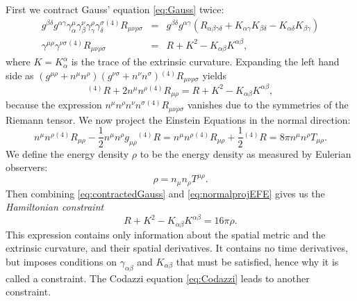 First we contract Gauss' equation \ref{eq:Gauss} twice:
\begin{equation}
\begin{array}{rcl}
g^{\beta \delta}g^{\alpha \gamma}\gamma_\alpha^\mu \gamma_\beta^\nu \gamma_\gamma^\rho \gamma_\delta^\sigma {}^{(4)}R_{\mu \nu \rho \sigma} & = & g^{\beta \delta}g^{\alpha \gamma}(R_{\alpha \beta \gamma \delta} + K_{\alpha \gamma}K_{\beta \delta} - K_{\alpha \delta}K_{\beta \gamma}) \\
\gamma^{\mu \rho} \gamma^{\nu \sigma}{}^{(4)}R_{\mu \nu \rho \sigma} & = &  R+K^2-K_{\alpha \beta}K^{\alpha \beta},
\end{array}
\end{equation}
where $K=K^\alpha_\alpha$ is the trace of the extrinsic curvature. Expanding the left hand side as $(g^{\mu \rho}+n^\mu n^\rho)(g^{\nu \sigma}+n^\nu n^\sigma){}^{(4)}R_{\mu \nu \rho \sigma}$ yields 
\begin{equation}
\label{eq:contractedGauss}
{}^{(4)}R+2 n^\mu n^\rho {}^{(4)}R_{\mu \rho} = R + K^2-K_{\alpha \beta}K^{\alpha \beta},
\end{equation}
because the expression $n^\mu n^\rho n^\nu n^\sigma {}^{(4)}R_{\mu \nu \rho \sigma}$ vanishes due to the symmetries of the Riemann tensor. We now project the Einstein Equations in the normal direction:
\begin{equation}
\label{eq:normalprojEFE}
n^\mu n^\rho {}^{(4)}R_{\mu \rho} - \frac{1}{2}n^\mu n^\rho g_{\mu \rho} {}^{(4)}R =n^\mu n^\rho {}^{(4)}R_{\mu \rho}+\frac{1}{2}{}^{(4)}R = 8 \pi n^\mu n^\rho T_{\mu \rho}.
\end{equation}
We define the energy density $\rho$ to be the energy density as measured by Eulerian observers: 
\begin{equation}
\label{eq:energydensity}
\rho = n_\mu n_\rho T^{\mu \rho}.
\end{equation}
Then combining \ref{eq:contractedGauss} and \ref{eq:normalprojEFE} gives us the \textit{Hamiltonian constraint}
\begin{equation}
\label{eq:HamiltonianConstraint}
R + K^2-K_{\alpha \beta}K^{\alpha \beta}=16\pi \rho.
\end{equation}
This expression contains only information about the spatial metric and the extrinsic curvature, and their spatial derivatives. It contains no time derivatives, but imposes conditions on $\gamma_{\alpha \beta}$ and $K_{\alpha \beta}$ that must be satisfied, hence why it is called a constraint. The Codazzi equation \ref{eq:Codazzi} leads to another constraint.


